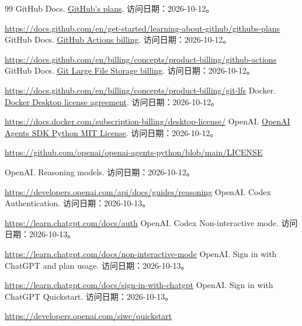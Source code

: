 \documentclass[11pt,a4paper]{article}
\begin{document}
\begin{thebibliography}{99}
 GitHub Docs. \href{https://docs.github.com/en/get-started/learning-about-github/githubs-plans}{GitHub's plans}. 访问日期：2026-10-12。\par\url{https://docs.github.com/en/get-started/learning-about-github/githubs-plans}
 GitHub Docs. \href{https://docs.github.com/en/billing/concepts/product-billing/github-actions}{GitHub Actions billing}. 访问日期：2026-10-12。\par\url{https://docs.github.com/en/billing/concepts/product-billing/github-actions}
 GitHub Docs. \href{https://docs.github.com/en/billing/concepts/product-billing/git-lfs}{Git Large File Storage billing}. 访问日期：2026-10-12。\par\url{https://docs.github.com/en/billing/concepts/product-billing/git-lfs}
 Docker. \href{https://docs.docker.com/subscription-billing/desktop-license/}{Docker Desktop license agreement}. 访问日期：2026-10-12。\par\url{https://docs.docker.com/subscription-billing/desktop-license/}
 OpenAI. \href{https://github.com/openai/openai-agents-python/blob/main/LICENSE}{OpenAI Agents SDK Python MIT License}. 访问日期：2026-10-12。\par\url{https://github.com/openai/openai-agents-python/blob/main/LICENSE}

 OpenAI. Reasoning models. 访问日期：2026-10-12。\par\url{https://developers.openai.com/api/docs/guides/reasoning}
 OpenAI. Codex Authentication. 访问日期：2026-10-13。\par\url{https://learn.chatgpt.com/docs/auth}
 OpenAI. Codex Non-interactive mode. 访问日期：2026-10-13。\par\url{https://learn.chatgpt.com/docs/non-interactive-mode}
 OpenAI. Sign in with ChatGPT and plan usage. 访问日期：2026-10-13。\par\url{https://learn.chatgpt.com/docs/sign-in-with-chatgpt}
 OpenAI. Sign in with ChatGPT Quickstart. 访问日期：2026-10-13。\par\url{https://developers.openai.com/siwc/quickstart}
\end{thebibliography}
\endgroup
\end{document}

